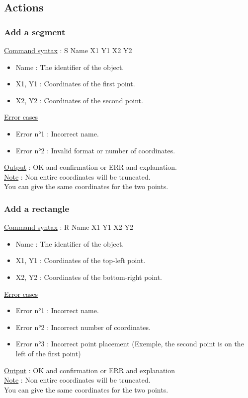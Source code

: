 \documentclass[a4paper, 12pts]{article}
\begin{document}
	\subsection{Actions}
		\subsubsection{Add a segment}
			\uline{Command syntax} :
			S Name X1 Y1 X2 Y2
			\begin{itemize}
				\item Name : The identifier of the object.
				\item X1, Y1 : Coordinates of the first point.
				\item X2, Y2 : Coordinates of the second point.
			\end{itemize}
			\uline{Error cases}
			\begin{itemize}
				\item Error n°1 : Incorrect name.
				\item Error n°2 : Invalid format or number of coordinates.
			\end{itemize}
			\uline{Output} : OK and confirmation or ERR and explanation.\\
			\uline{Note} : 
			Non entire coordinates will be truncated.\\
			You can give the same coordinates for the two points.

		\subsubsection{Add a rectangle}
			\uline{Command syntax} :
			R Name X1 Y1 X2 Y2
			\begin{itemize}
				\item Name : The identifier of the object.
				\item X1, Y1 : Coordinates of the top-left point.
				\item X2, Y2 : Coordinates of the bottom-right point.
			\end{itemize}
			\uline{Error cases}
			\begin{itemize}
				\item Error n°1 : Incorrect name.
				\item Error n°2 : Incorrect number of coordinates.
				\item Error n°3 : Incorrect point placement (Exemple, the second point is on the left of the first point)
			\end{itemize}
			\uline{Output} : OK and confirmation or ERR and explanation\\
			\uline{Note} : 
			Non entire coordinates will be truncated.\\
			You can give the same coordinates for the two points.
\end{document}
